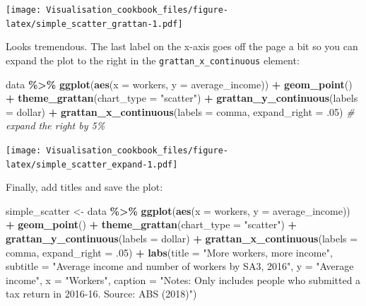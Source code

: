 \documentclass[
]{book}
\newenvironment{Shaded}{\begin{snugshade}}{\end{snugshade}}
\newcommand{\CommentTok}[1]{\textcolor[rgb]{0.56,0.35,0.01}{\textit{#1}}}
\newcommand{\DataTypeTok}[1]{\textcolor[rgb]{0.13,0.29,0.53}{#1}}
\newcommand{\FloatTok}[1]{\textcolor[rgb]{0.00,0.00,0.81}{#1}}
\newcommand{\KeywordTok}[1]{\textcolor[rgb]{0.13,0.29,0.53}{\textbf{#1}}}
\newcommand{\NormalTok}[1]{#1}
\newcommand{\OperatorTok}[1]{\textcolor[rgb]{0.81,0.36,0.00}{\textbf{#1}}}
\newcommand{\StringTok}[1]{\textcolor[rgb]{0.31,0.60,0.02}{#1}}
\begin{document}
\texttt{[image: Visualisation\_cookbook\_files/figure-latex/simple\_scatter\_grattan-1.pdf]}

Looks tremendous. The last label on the x-axis goes off the page a bit so you can expand the plot to the right in the \texttt{grattan\_x\_continuous} element:

\begin{Shaded}
\begin{Highlighting}[]
\NormalTok{data }\OperatorTok{\%\textgreater{}\%}\StringTok{ }
\StringTok{  }\KeywordTok{ggplot}\NormalTok{(}\KeywordTok{aes}\NormalTok{(}\DataTypeTok{x =}\NormalTok{ workers,}
             \DataTypeTok{y =}\NormalTok{ average\_income)) }\OperatorTok{+}\StringTok{ }
\StringTok{  }\KeywordTok{geom\_point}\NormalTok{()  }\OperatorTok{+}
\StringTok{  }\KeywordTok{theme\_grattan}\NormalTok{(}\DataTypeTok{chart\_type =} \StringTok{"scatter"}\NormalTok{) }\OperatorTok{+}\StringTok{ }
\StringTok{  }\KeywordTok{grattan\_y\_continuous}\NormalTok{(}\DataTypeTok{labels =}\NormalTok{ dollar) }\OperatorTok{+}\StringTok{ }
\StringTok{  }\KeywordTok{grattan\_x\_continuous}\NormalTok{(}\DataTypeTok{labels =}\NormalTok{ comma,}
                       \DataTypeTok{expand\_right =} \FloatTok{.05}\NormalTok{) }\CommentTok{\# expand the right by 5\%}
\end{Highlighting}
\end{Shaded}

\texttt{[image: Visualisation\_cookbook\_files/figure-latex/simple\_scatter\_expand-1.pdf]}

Finally, add titles and save the plot:

\begin{Shaded}
\begin{Highlighting}[]
\NormalTok{simple\_scatter \textless{}{-}}\StringTok{ }\NormalTok{data }\OperatorTok{\%\textgreater{}\%}\StringTok{ }
\StringTok{  }\KeywordTok{ggplot}\NormalTok{(}\KeywordTok{aes}\NormalTok{(}\DataTypeTok{x =}\NormalTok{ workers,}
             \DataTypeTok{y =}\NormalTok{ average\_income)) }\OperatorTok{+}\StringTok{ }
\StringTok{  }\KeywordTok{geom\_point}\NormalTok{()  }\OperatorTok{+}
\StringTok{  }\KeywordTok{theme\_grattan}\NormalTok{(}\DataTypeTok{chart\_type =} \StringTok{"scatter"}\NormalTok{) }\OperatorTok{+}\StringTok{ }
\StringTok{  }\KeywordTok{grattan\_y\_continuous}\NormalTok{(}\DataTypeTok{labels =}\NormalTok{ dollar) }\OperatorTok{+}\StringTok{ }
\StringTok{  }\KeywordTok{grattan\_x\_continuous}\NormalTok{(}\DataTypeTok{labels =}\NormalTok{ comma,}
                       \DataTypeTok{expand\_right =} \FloatTok{.05}\NormalTok{) }\OperatorTok{+}\StringTok{ }
\StringTok{  }\KeywordTok{labs}\NormalTok{(}\DataTypeTok{title =} \StringTok{"More workers, more income"}\NormalTok{,}
       \DataTypeTok{subtitle =} \StringTok{"Average income and number of workers by SA3, 2016"}\NormalTok{,}
       \DataTypeTok{y =} \StringTok{"Average income"}\NormalTok{,}
       \DataTypeTok{x =} \StringTok{"Workers"}\NormalTok{,}
       \DataTypeTok{caption =} \StringTok{"Notes: Only includes people who submitted a tax return in 2016{-}16. Source: ABS (2018)"}\NormalTok{)}
\end{Highlighting}
\end{Shaded}
\end{document}
